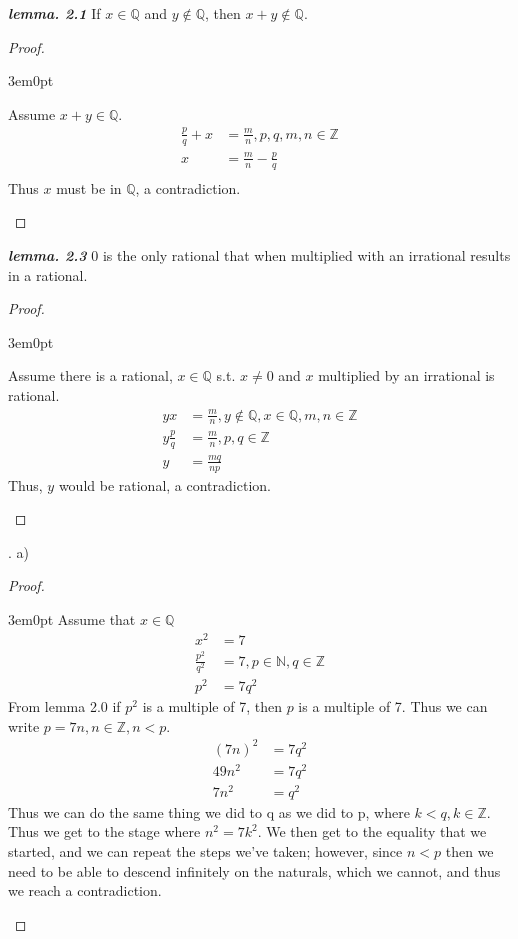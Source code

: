 \documentclass[11pt]{article}
\newcommand{\bproof}{\begin{proof}
$ $ \\
\begin{adjustwidth}{3em}{0pt}
}
\newcommand{\eproof}{\end{adjustwidth}
\end{proof}}
\begin{document}
\begin{flushleft}
\emph{\textbf{lemma. 2.1}} If $x \in \mathbb{Q}$ and $y \notin \mathbb{Q}$, then $x+y \notin \mathbb{Q}$.

\bproof
Assume $x+y \in \mathbb{Q}$.
\begin{align*}
\frac{p}{q} + x & = \frac{m}{n}, p,q,m,n \in \mathbb{Z} \\
x & = \frac{m}{n} - \frac{p}{q} \\
\end{align*}
Thus $x$ must be in $\mathbb{Q}$, a contradiction.
\eproof

\emph{\textbf{lemma. 2.3}} 0 is the only rational that when multiplied with an irrational results in a rational.
\bproof
Assume there is a rational, $x \in \mathbb{Q}$ s.t. $x \neq 0$ and $x$ multiplied by an irrational is rational.
\begin{align*}
yx & = \frac{m}{n}, y \notin \mathbb{Q}, x \in \mathbb{Q}, m,n \in \mathbb{Z} \\
y\frac{p}{q} & = \frac{m}{n}, p,q \in \mathbb{Z} \\
y & = \frac{mq}{np}
\end{align*}
Thus, $y$ would be rational, a contradiction.
\eproof

. a)\bigskip
\begin{proof}
$ $ \\
\begin{adjustwidth}{3em}{0pt}
Assume that $x \in \mathbb{Q}$
\begin{align*}
x^2 & = 7 \\
\frac{p^2}{q^2} & = 7, p \in \mathbb{N}, q \in \mathbb{Z} \\
p^2 & = 7q^2
\end{align*}
From lemma 2.0 if $p^2$ is a multiple of 7, then $p$ is a multiple of 7.
Thus we can write $p = 7n, n \in \mathbb{Z}, n<p$. 
\begin{align*}
(7n)^2 & = 7q^2 \\
49n^2 & = 7q^2 \\
7n^2 & = q^2
\end{align*}
Thus we can do the same thing we did to q as we did to p, where
$k<q, k \in \mathbb{Z}$. Thus we get to the stage where $n^2 = 7k^2$. We then get to the equality that we started, and we can repeat the steps we've taken; however, since $n<p$ then we need to be able to descend infinitely on the naturals, which we cannot, and thus we reach a contradiction.
\end{adjustwidth}
\end{proof}
\bigskip


\end{flushleft}
\end{document}
